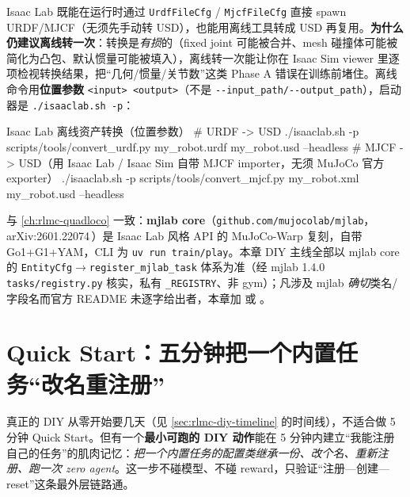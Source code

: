 \begin{note}
Isaac Lab 既能在运行时通过 \verb|UrdfFileCfg| / \verb|MjcfFileCfg| 直接 spawn URDF/MJCF（无须先手动转 USD），也能用离线工具转成 USD 再复用。\textbf{为什么仍建议离线转一次}：转换是\emph{有损}的（fixed joint 可能被合并、mesh 碰撞体可能被简化为凸包、默认惯量可能被填入），离线转一次能让你在 Isaac Sim viewer 里逐项检视转换结果，把“几何/惯量/关节数”这类 Phase A 错误在训练前堵住。离线命令用\textbf{位置参数} \verb|<input> <output>|（不是 \verb|--input_path/--output_path|），启动器是 \verb|./isaaclab.sh -p|：
\begin{codebox}[bash]{Isaac Lab 离线资产转换（位置参数）}
# URDF -> USD
./isaaclab.sh -p scripts/tools/convert_urdf.py  my_robot.urdf  my_robot.usd  --headless
# MJCF -> USD（用 Isaac Lab / Isaac Sim 自带 MJCF importer，无须 MuJoCo 官方 exporter）
./isaaclab.sh -p scripts/tools/convert_mjcf.py  my_robot.xml   my_robot.usd  --headless
\end{codebox}
\end{note}

\begin{note}
与 \cref{ch:rlmc-quadloco} 一致：\textbf{mjlab core}（\verb|github.com/mujocolab/mjlab|，arXiv:2601.22074\,\cite{mjlab2026}）是 Isaac Lab 风格 API 的 MuJoCo-Warp 复刻，自带 Go1+G1+YAM，CLI 为 \verb|uv run train/play|。本章 DIY 主线全部以 mjlab core 的 \texttt{EntityCfg}$\to$\texttt{register\_mjlab\_task} 体系为准（经 mjlab 1.4.0 \texttt{tasks/registry.py} 核实，私有 \texttt{\_REGISTRY}、非 gym）；凡涉及 mjlab \emph{确切}类名/字段名而官方 README 未逐字给出者，本章加 \rebuilt{} 或 。
\end{note}

\section{Quick Start：五分钟把一个内置任务“改名重注册”}
\label{sec:rlmc-diy-quickstart}

真正的 DIY 从零开始要几天（见 \cref{sec:rlmc-diy-timeline} 的时间线），不适合做 5 分钟 Quick Start。但有一个\textbf{最小可跑的 DIY 动作}能在 5 分钟内建立“我能注册自己的任务”的肌肉记忆：\emph{把一个内置任务的配置类继承一份、改个名、重新注册、跑一次 zero agent}。这一步不碰模型、不碰 reward，只验证“注册—创建—reset”这条最外层链路通。


